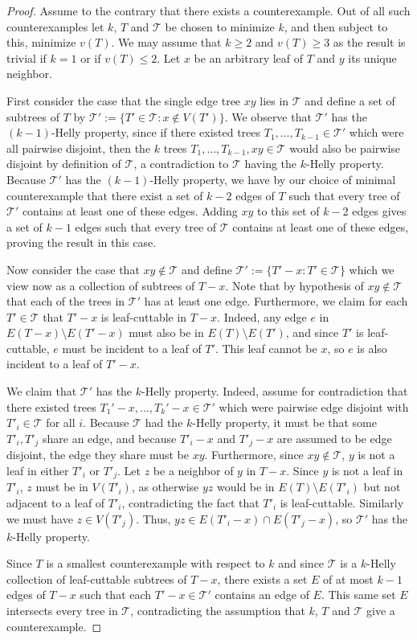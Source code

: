 \documentclass[12pt,letterpaper]{article}
\theoremstyle{definition}
\renewcommand{\c}[1]{\mathcal{#1}}
\begin{document}
	\begin{proof}
		Assume to the contrary that there exists a counterexample. Out of all such counterexamples let $k$, $T$ and $\mathcal{T}$ be chosen to minimize $k$, and then subject to this, minimize $v(T)$. We may assume that $k\ge 2$ and $v(T)\geq 3$ as the result is trivial if $k=1$ or if $v(T)\leq 2$. Let $x$ be an arbitrary leaf of $T$ and $y$ its unique neighbor. 
		
		First consider the case that the single edge tree $xy$ lies in $\c{T}$ and define a set of subtrees of $T$ by $\c{T}':=\{T'\in \c{T}:x\notin V(T')\}$.  We observe that $\c{T}'$ has the $(k-1)$-Helly property, since if there existed trees $T_1,\ldots,T_{k-1}\in \c{T}'$ which were all pairwise disjoint, then the $k$ trees $T_1,\ldots,T_{k-1},xy\in \c{T}$ would also be pairwise disjoint by definition of $\c{T}$, a contradiction to $\c{T}$ having the $k$-Helly property.  Because $\c{T}'$ has the $(k-1)$-Helly property, we have by our choice of minimal counterexample that there exist a set of $k-2$ edges of $T$ such that every tree of $\c{T}'$ contains at least one of these edges.  Adding $xy$ to this set of $k-2$ edges gives a set of $k-1$ edges such that every tree of $\c{T}$ contains at least one of these edges, proving the result in this case.
		
		Now consider the case that $xy\notin \c{T}$ and define $\c{T}':=\{T'-x:T'\in \c{T}\}$ which we view now as a collection of subtrees of $T-x$.  Note that by hypothesis of $xy\notin \c{T}$ that each of the trees in $\c{T}'$ has at least one edge. Furthermore, we claim for each $T'\in \c{T}$ that $T'-x$ is leaf-cuttable in $T-x$. Indeed, any edge $e$ in $E(T-x)\setminus E(T'-x)$ must also be in $E(T)\setminus E(T')$, and since $T'$ is leaf-cuttable, $e$ must be incident to a leaf of $T'$. This leaf cannot be $x$, so $e$ is also incident to a leaf of $T'-x$.
		
		We claim that $\c{T}'$ has the $k$-Helly property.  Indeed, assume for contradiction that there existed trees $T_1'-x,\ldots,T_k'-x\in \c{T}'$ which were pairwise edge disjoint with $T'_i\in \c{T}$ for all $i$.  Because $\c{T}$ had the $k$-Helly property, it must be that some $T'_i,T'_j$ share an edge, and because $T'_i-x$ and $T'_j-x$ are assumed to be edge disjoint, the edge they share must be $xy$. Furthermore, since $xy\not\in \mathcal{T}$, $y$ is not a leaf in either $T'_i$ or $T'_j$.  Let $z$ be a neighbor of $y$ in $T-x$. Since $y$ is not a leaf in $T'_i$, $z$ must be in $V(T'_i)$, as otherwise $yz$ would be in $E(T)\setminus E(T'_i)$ but not adjacent to a leaf of $T'_i$, contradicting the fact that $T'_i$ is leaf-cuttable. Similarly we must have $z\in V(T'_j)$. Thus, $yz\in E(T'_i-x)\cap E(T'_j-x)$, so $\mathcal{T}'$ has the $k$-Helly property.
		
		Since $T$ is a smallest counterexample with respect to $k$ and since $\mathcal{T}$ is a $k$-Helly collection of leaf-cuttable subtrees of $T-x$, there exists a set $E$ of at most $k-1$ edges of $T-x$ such that each $T'-x\in \mathcal{T}'$ contains an edge of $E$. This same set $E$ intersects every tree in $\mathcal{T}$, contradicting the assumption that $k$, $T$ and $\mathcal{T}$ give a counterexample.
	\end{proof}
	
\end{document}
